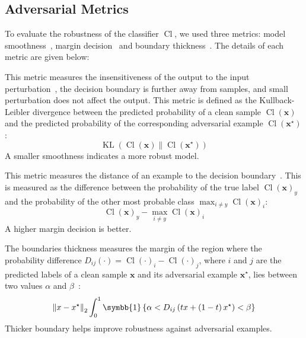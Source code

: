 \documentclass[../main.tex]{subfiles}
\begin{document}
	\subsection{Adversarial Metrics}
		To evaluate the robustness of the classifier \(\operatorname{Cl}\), we used three metrics: model smoothness~\cite{MarginDecision}, margin decision~\cite{MarginDecision} and boundary thickness~\cite{AdvBoundaryThick}.
		The details of each metric are given below:
		\begin{description}[
				style=multiline,
				leftmargin=!,
				labelwidth=2.5cm
			]
			\item[Model smoothness]
				This metric measures the insensitiveness of the output to the input perturbation~\cite{MarginDecision}, \ie{} the decision boundary is further away from samples, and small perturbation does not affect the output.
				This metric is defined as the Kullback-Leibler divergence between the predicted probability of a clean sample \(\operatorname{Cl}\left(\symbf{x}\right)\) and the predicted probability of the corresponding adversarial example \(\operatorname{Cl}\left(\symbf{x}^{\star}\right)\):
				\begin{equation}
					\operatorname{KL}\left(\operatorname{Cl}\left(\symbf{x}\right) \| \operatorname{Cl}\left(\symbf{x}^{\star}\right)\right)
				\end{equation}
				A smaller smoothness indicates a more robust model.
			\item[Margin decision]
				This metric measures the distance of an example to the decision boundary~\cite{MarginDecision}.
				This is measured as the difference between the probability of the true label \(\operatorname{Cl}\left(\symbf{x}\right)_{y}\) and the probability of the other most probable class \(\max_{i \neq y} \operatorname{Cl}\left(\symbf{x}\right)_{i}\):
				\begin{equation}
					\operatorname{Cl}\left(\symbf{x}\right)_{y} - \max_{i \neq y} \operatorname{Cl}\left(\symbf{x}\right)_{i}
				\end{equation}
				A higher margin decision is better.
			\item[Boundary thickness]
				The boundaries thickness measures the margin of the region where the probability difference \(D_{ij}\left(\cdot\right) = \operatorname{Cl}\left(\cdot\right)_{i} - \operatorname{Cl}\left(\cdot\right)_{j}\), where \(i\) and \(j\) are the predicted labels of a clean sample \(\symbf{x}\) and its adversarial example \(\symbf{x}^{\star}\), lies between two values \(\alpha\) and \(\beta\)~\cite{AdvBoundaryThick}:
				\begin{equation}
					\left\|x - x^{\star}\right\|_{2} \int_{0}^{1} \symbb{1}\left\{ \alpha < D_{ij}\left(tx + \left(1-t\right)x^{\star} \right) < \beta\right\}
				\end{equation}
				Thicker boundary helps improve robustness against adversarial examples.
		\end{description}
\end{document}
